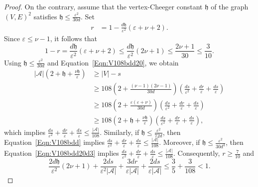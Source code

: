 \documentclass[ALCO,Unicode,published]{cedram}
\newcommand{\scrA}{\ensuremath{\mathscr{A}}}
\newcommand{\tth}{\ensuremath{\mathfrak{h}}}
\begin{document}
\begin{proof}
On the contrary, assume that the vertex-Cheeger constant $\tth$ of the graph $(V, E)^2$ satisfies $\tth \leq  \frac{\varepsilon^{2}}{30d}$. 
Set 
\begin{align*}
r & =  1- \frac {d \tth}{ \varepsilon^2}  ( \varepsilon + \nu + 2).
\end{align*}
Since $\varepsilon \leq \nu -1$, it follows that 
$$
1 - r = \frac {d \tth}{ \varepsilon^2}  ( \varepsilon + \nu + 2)
\leq \frac {d \tth}{ \varepsilon^2}  (2\nu+1) 
\leq \frac{2\nu +1}{30}
\leq \frac 3{10}.$$
Using $\tth \leq  \frac{\varepsilon^{2}}{30d}$ and Equation~\eqref{Eqn:V108bdd20}, we obtain 
\begin{align*}
|\scrA| \left( 2 + \tth + \frac {\nu \tth} {\varepsilon} \right) 
& \geq 
|V| - s\\
& \geq 
108 \left( 2 + \frac {(\nu-1)(2\nu -1)} {30d}  \right)  
\left( \frac{ds}{\varepsilon^2} + \frac{dr}\varepsilon + \frac{ds}{\varepsilon}\right) \\
& \geq 
108 \left( 2 + \frac {\varepsilon (\varepsilon  + \nu)} {30d}  \right)  
\left( \frac{ds}{\varepsilon^2} + \frac{dr}\varepsilon + \frac{ds}{\varepsilon}\right) \\
& \geq 
108 \left( 2 + \tth + \frac {\nu\tth} {\varepsilon} \right)  
\left( \frac{ds}{\varepsilon^2} + \frac{dr}\varepsilon + \frac{ds}{\varepsilon}\right) ,
\end{align*}
which implies 
$ \frac{ ds}{\varepsilon^2 }
+ \frac{ dr}{\varepsilon } + \frac{ds}{\varepsilon}\leq \frac{|\scrA|}{108}$. 
Similarly, if $\tth \leq  \frac{\varepsilon^{2}}{72d}$, then Equation~\eqref{Eqn:V108bdd} implies 
$ \frac{ ds}{\varepsilon^2 }
+ \frac{ dr}{\varepsilon } + \frac{ds}{\varepsilon} \leq \frac{|\scrA|}{108}$. 
Moreover, if $\tth \leq  \frac{\varepsilon^{2}}{30d^3}$, then Equation~\eqref{Eqn:V108bdd20d3} implies 
$ \frac{ ds}{\varepsilon^2 }
+ \frac{ dr}{\varepsilon } + \frac{ds}{\varepsilon}\leq \frac{|\scrA|}{108}$. Consequently, $r\geq \frac 7{10}$ and 
$$
\frac {2d\tth} { \varepsilon^2} ( 2\nu + 1) 
+ \frac{2d s}{\varepsilon^2 |\scrA|}
+ \frac{3dr}{\varepsilon |\scrA|}
+ \frac{2ds}{\varepsilon |\scrA|}
\leq 
\frac 3{5} + \frac 3 {108} 
< 1.
$$
 

\end{proof}
\end{document}
